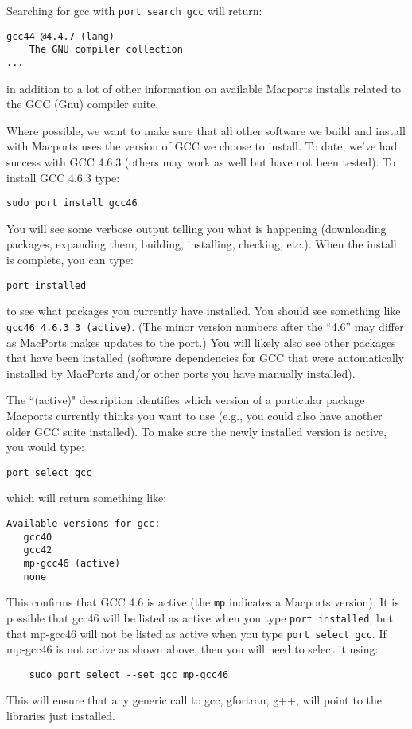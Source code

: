 \begin{mdframed}[style=mac] %
Searching for gcc with \texttt{port search gcc} will return:

\begin{verbatim}
gcc44 @4.4.7 (lang) 
    The GNU compiler collection 
...
\end{verbatim}

in addition to a lot of other information on available Macports installs related to the GCC (Gnu) compiler suite. 

Where possible, we want to make sure that all other software we build and install 
with Macports uses the version of GCC we choose to install. To date, we've had success 
with GCC 4.6.3 (others may work as well but have not been tested). 
To install GCC 4.6.3 type:

\texttt{sudo port install gcc46}

You will see some verbose output telling you what is happening (downloading packages, 
expanding them, building, installing, checking, etc.). When the install is complete, you can type: 

\texttt{port installed} 

to see what packages you currently have installed. You should see 
something like \texttt{gcc46 \@4.6.3\_3 (active)}. 
(The minor version numbers after the ``4.6'' may differ as MacPorts makes updates to the port.) 
You will likely also see other packages that have been installed (software dependencies for GCC 
that were automatically installed by MacPorts and/or other ports you have manually installed). 

The ``(active)" description identifies which version of a particular package Macports 
currently thinks you want to use (e.g., you could also have another older GCC suite installed). 
To make sure the newly installed version is active, you would type:

\texttt{port select gcc}

which will return something like:

\begin{verbatim}
Available versions for gcc:
   gcc40
   gcc42
   mp-gcc46 (active)
   none
\end{verbatim}

This confirms that GCC 4.6 is active (the \texttt{mp} indicates a Macports version). 
It is possible that gcc46 will be listed as active when you type \texttt{port installed}, 
but that mp-gcc46 will not be listed as active when you type \texttt{port select gcc}. 
If mp-gcc46 is not active as shown above, then you will need to select it using:

\begin{verbatim}
	sudo port select --set gcc mp-gcc46
\end{verbatim}

This will ensure that any generic call to gcc, gfortran, g++, will point to the libraries just installed.

\end{mdframed}              %


